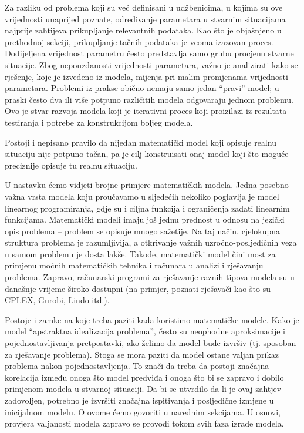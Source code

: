 \documentclass[a4paper, utf8, 11pt, colorlinks]{book}
\begin{document}
Za razliku od problema koji su već definisani u udžbenicima, u kojima su ove vrijednosti unaprijed poznate,   određivanje parametara u stvarnim situacijama najprije zahtijeva prikupljanje relevantnih podataka. Kao što je objašnjeno u prethodnoj sekciji,  prikupljanje tačnih podataka je veoma izazovan proces. Dodijeljena vrijednost parametru često predstavlja  samo grubu procjenu stvarne situacije. Zbog nepouzdanosti vrijednosti parametara, važno je analizirati kako se rješenje, koje je izvedeno iz modela, mijenja pri malim promjenama vrijednosti parametara. 
 Problemi iz prakse obično nemaju samo jedan ``pravi'' model; u praski   često   dva ili više potpuno različitih modela odgovaraju jednom problemu. 
Ovo je stvar razvoja modela koji je iterativni proces koji proizilazi iz rezultata testiranja i potrebe za konstrukcijom boljeg modela.

Postoji i nepisano pravilo da nijedan matematički model koji opisuje realnu situaciju nije potpuno tačan, pa je cilj konstruisati onaj model koji  što moguće preciznije opisuje tu realnu situaciju.


 U nastavku  ćemo vidjeti brojne primjere matematičkih modela. Jedna posebno važna vrsta modela koju proučavamo u sljedećih nekoliko poglavlja
je model linearnog programiranja, gdje su i ciljna funkcija i ograničenja zadati linearnim funkcijama. 
Matematički modeli imaju još jednu prednost u odnosu na jezički opis problema -- problem se opisuje mnogo sažetije. Na taj način, cjelokupna struktura problema je razumljivija, a otkrivanje važnih uzročno-posljedičnih veza u samom problemu je dosta lakše. Takođe, matematički
model čini most za primjenu moćnih matematičkih tehnika i računara u
analizi i rješavanju problema. Zapravo, računarski programi za rješavanje raznih tipova modela su  u današnje vrijeme  široko dostupni (na primjer, poznati rješavači kao što su CPLEX, Gurobi, Lindo itd.). 

  Postoje i zamke na koje treba paziti kada koristimo matematičke modele. Kako je model ``apstraktna idealizacija problema'', često  su neophodne aproksimacije i pojednostavljivanja pretpostavki, ako želimo da model bude izvršiv (tj. sposoban za rješavanje problema). Stoga se mora paziti da model ostane valjan prikaz problema nakon pojednostavljenja. To znači da treba da postoji značajna korelacija između onoga što model predviđa i onoga što bi se zapravo i dobilo primjenom modela u stvarnoj situaciji. Da bi se utvrdilo da li je ovaj zahtjev zadovoljen, potrebno je izvršiti značajna ispitivanja i posljedične izmjene u inicijalnom modelu. O ovome ćemo govoriti u narednim sekcijama. U osnovi, provjera valjanosti modela zapravo se provodi tokom svih  faza izrade modela. 
  
\end{document}
